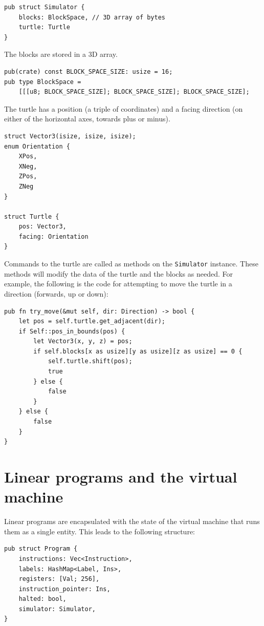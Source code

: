 \documentclass{report}
\begin{document}
\begin{verbatim}
pub struct Simulator {
    blocks: BlockSpace, // 3D array of bytes
    turtle: Turtle
}
\end{verbatim}

The blocks are stored in a 3D array.

\begin{verbatim}
pub(crate) const BLOCK_SPACE_SIZE: usize = 16;
pub type BlockSpace = 
    [[[u8; BLOCK_SPACE_SIZE]; BLOCK_SPACE_SIZE]; BLOCK_SPACE_SIZE];
\end{verbatim}

The turtle has a position (a triple of coordinates) and a facing direction (on either of the horizontal axes, towards plus or minus).
\begin{verbatim}
struct Vector3(isize, isize, isize);
enum Orientation {
    XPos,
    XNeg,
    ZPos,
    ZNeg
}

struct Turtle {
    pos: Vector3,
    facing: Orientation
}
\end{verbatim}

Commands to the turtle are called as methods on the \verb|Simulator| instance. These methods will modify the data of the turtle and the blocks as needed. For example, the following is the code for attempting to move the turtle in a direction (forwards, up or down):

\begin{verbatim}
pub fn try_move(&mut self, dir: Direction) -> bool {
    let pos = self.turtle.get_adjacent(dir);
    if Self::pos_in_bounds(pos) {
        let Vector3(x, y, z) = pos;
        if self.blocks[x as usize][y as usize][z as usize] == 0 {
            self.turtle.shift(pos);
            true
        } else {
            false
        }
    } else {
        false
    }
}
\end{verbatim}

\section{Linear programs and the virtual machine}
Linear programs are encapsulated with the state of the virtual machine that runs them as a single entity. This leads to the following structure:

\begin{verbatim}
pub struct Program {
    instructions: Vec<Instruction>,
    labels: HashMap<Label, Ins>,
    registers: [Val; 256],
    instruction_pointer: Ins,
    halted: bool,
    simulator: Simulator,
}
\end{verbatim}
\end{document}
